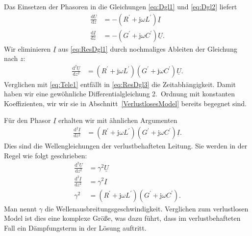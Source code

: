 \documentclass[paper=a4, parskip=half-, ngerman, fontsize=11pt]{scrreprt}
\begin{document}
Das Einsetzen der Phasoren in die Gleichungen \eqref{eq:Dgl1} und \eqref{eq:Dgl2} liefert
\begin{align}
    \frac{\text{d} \underline{U}}{\text{d} z} &= - \left( R^{\prime} + \mathrm{j} \omega L^{\prime} \right)
    \underline{I} \label{eq:ResDgl1} \\[1ex]
    \frac{\text{d} \underline{I}}{\text{d} z} &= - \left( G^{\prime} + \mathrm{j} \omega C^{\prime} \right)
    \underline{U}.
\end{align}
Wir eliminieren $\underline{I}$ aus \eqref{eq:ResDgl1} durch nochmaliges Ableiten der Gleichung nach $z$:
\begin{align}
    \frac{\text{d}^{2} \underline{U}}{\text{d} z^{2}} &= \left( R^{\prime} + \mathrm{j} \omega L^{\prime} \right)
    \left( G^{\prime} + \mathrm{j} \omega C^{\prime} \right) \underline{U} \label{eq:ResDgl3}.
\end{align}
Verglichen mit \eqref{eq:Tele1} entfällt in \eqref{eq:ResDgl3} die Zeitabhängigkeit. Damit haben wir eine gewöhnliche
Differentialgleichung 2.~Ordnung mit konstanten Koeffizienten, wir wir sie in Abschnitt~\ref{VerlustlosesModel} bereits
begegnet sind.

Für den Phasor $\underline{I}$ erhalten wir mit ähnlichen Argumenten
\begin{align}
    \frac{\text{d}^{2} \underline{I}}{\text{d} z^{2}} &= \left( R^{\prime} + \mathrm{j} \omega L^{\prime} \right)
    \left( G^{\prime} + \mathrm{j} \omega C^{\prime} \right) \underline{I}.
\end{align}
Dies sind die Wellengleichungen der verlustbehafteten Leitung. Sie werden in der Regel wie folgt geschrieben:
\begin{align}
    \frac{\text{d}^{2} \underline{U}}{\text{d} z^{2}} &= \gamma^{2} \underline{U} \label{eq:VerlustDgl1} \\[1ex]
    \frac{\text{d}^{2} \underline{I}}{\text{d} z^{2}} &= \gamma^{2} \underline{I} \label{eq:VerlustDgl2} \\[1ex]
    \gamma^{2} &= \left( R^{\prime} + \mathrm{j} \omega L^{\prime} \right) \left( G^{\prime} + \mathrm{j} \omega
    C^{\prime} \right) \label{eq:Gamma}.
\end{align}
Man nennt $\gamma$ die Wellenausbreitungsgeschwindigkeit. Verglichen zum verlustlosen Model ist dies eine komplexe
Größe, was dazu führt, dass im verlustbehafteten Fall ein Dämpfungsterm in der Lösung auftritt.
\end{document}
